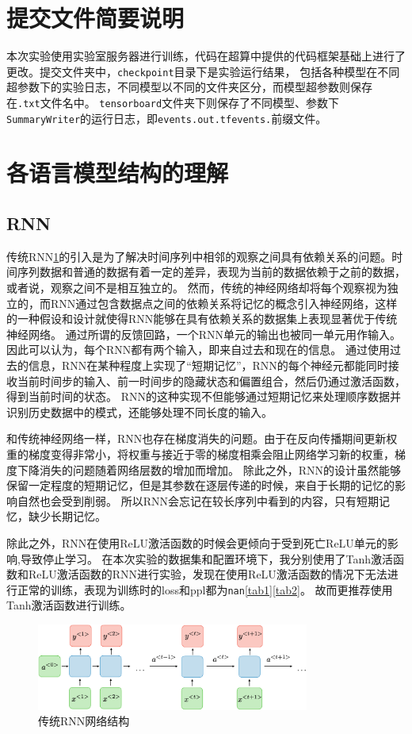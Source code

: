 \documentclass[]{ctexart}
\begin{document}
\section{提交文件简要说明}
本次实验使用实验室服务器进行训练，代码在超算中提供的代码框架基础上进行了更改。提交文件夹中，\texttt{checkpoint}目录下是实验运行结果，
包括各种模型在不同超参数下的实验日志，不同模型以不同的文件夹区分，而模型超参数则保存在\texttt{.txt}文件名中。
\texttt{tensorboard}文件夹下则保存了不同模型、参数下\texttt{SummaryWriter}的运行日志，即\texttt{events.out.tfevents.}前缀文件。
\section{各语言模型结构的理解}

\subsection{RNN}
传统RNN\ref{rnn}的引入是为了解决时间序列中相邻的观察之间具有依赖关系的问题。时间序列数据和普通的数据有着一定的差异，表现为当前的数据依赖于之前的数据，或者说，观察之间不是相互独立的。
然而，传统的神经网络却将每个观察视为独立的，而RNN通过包含数据点之间的依赖关系将记忆的概念引入神经网络，这样的一种假设和设计就使得RNN能够在具有依赖关系的数据集上表现显著优于传统神经网络。
通过所谓的反馈回路，一个RNN单元的输出也被同一单元用作输入。因此可以认为，每个RNN都有两个输入，即来自过去和现在的信息。
通过使用过去的信息，RNN在某种程度上实现了“短期记忆”，RNN的每个神经元都能同时接收当前时间步的输入、前一时间步的隐藏状态和偏置组合，然后仍通过激活函数，得到当前时间的状态。
RNN的这种实现不但能够通过短期记忆来处理顺序数据并识别历史数据中的模式，还能够处理不同长度的输入。

和传统神经网络一样，RNN也存在梯度消失的问题。由于在反向传播期间更新权重的梯度变得非常小，将权重与接近于零的梯度相乘会阻止网络学习新的权重，梯度下降消失的问题随着网络层数的增加而增加。
除此之外，RNN的设计虽然能够保留一定程度的短期记忆，但是其参数在逐层传递的时候，来自于长期的记忆的影响自然也会受到削弱。
所以RNN会忘记在较长序列中看到的内容，只有短期记忆，缺少长期记忆。

除此之外，RNN在使用ReLU激活函数的时候会更倾向于受到死亡ReLU单元的影响,导致停止学习。
在本次实验的数据集和配置环境下，我分别使用了Tanh激活函数和ReLU激活函数的RNN进行实验，发现在使用ReLU激活函数的情况下无法进行正常的训练，表现为训练时的loss和ppl都为\texttt{nan}\ref{tab1}\ref{tab2}。
故而更推荐使用Tanh激活函数进行训练。
\begin{figure}[htb]
  \centering
  \includegraphics[width=0.8\textwidth]{asset/a_rnn.png}
  \caption{传统RNN网络结构}
  \label{rnn}
\end{figure}
\end{document}
